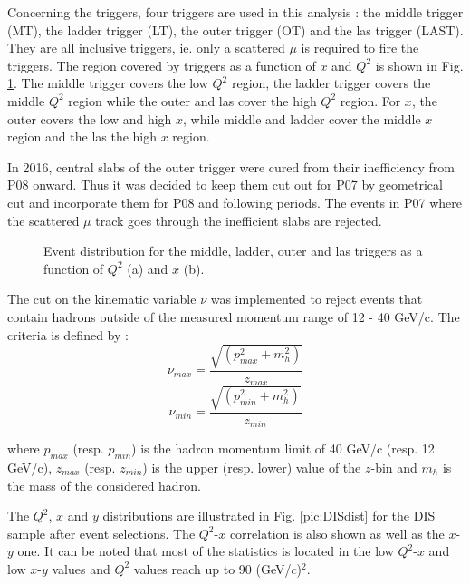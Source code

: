 Concerning the triggers, four triggers are used in this analysis : the middle trigger (MT), the ladder trigger (LT), the outer trigger (OT) and the las trigger (LAST). They are all inclusive triggers, ie. only a scattered $\mu$ is required to fire the triggers. The region covered by triggers as a function of $x$ and $Q^2$ is shown in Fig. \ref{pic:triggerxQ2}. The middle trigger covers the low $Q^2$ region, the ladder trigger covers the middle $Q^2$ region while the outer and las cover the high $Q^2$ region. For $x$, the outer covers the low and high $x$, while middle and ladder cover the middle $x$ region and the las the high $x$ region.

In 2016, central slabs of the outer trigger were cured from their inefficiency from P08 onward. Thus it was decided to keep them cut out for P07 by geometrical cut and incorporate them for P08 and following periods. The events in P07 where the scattered $\mu$ track goes through the inefficient slabs are rejected.

\begin{figure}[!h]
	\caption{Event distribution for the middle, ladder, outer and las triggers as a function of $Q^2$ (a) and $x$ (b).}
	\label{pic:triggerxQ2}
\end{figure}

The cut on the kinematic variable $\nu$ was implemented to reject events that contain hadrons outside of the measured
momentum range of 12 - 40 GeV/c. The criteria is defined by :
\begin{equation}
  \nu_{max} = \frac{\sqrt{(p^2_{max}+m^2_h)}}{z_{max}}
\end{equation}
\begin{equation}
  \nu_{min} = \frac{\sqrt{(p^2_{min}+m^2_h)}}{z_{min}}
\end{equation}

where $p_{max}$ (resp. $p_{min}$) is the hadron momentum limit of 40 GeV/c (resp. 12 GeV/c), $z_{max}$ (resp. $z_{min}$)
is the upper (resp. lower) value of the $z$-bin and $m_h$ is the mass of the considered hadron.

The $Q^2$, $x$ and $y$ distributions are illustrated in Fig. \ref{pic:DISdist} for the DIS sample after event selections. The $Q^2$-$x$ correlation is also shown as well as the $x$-$y$ one. It can be noted that most of the statistics is located in the low $Q^2$-$x$ and low $x$-$y$ values and $Q^2$ values reach up to 90 (GeV/$c$)$^2$.

